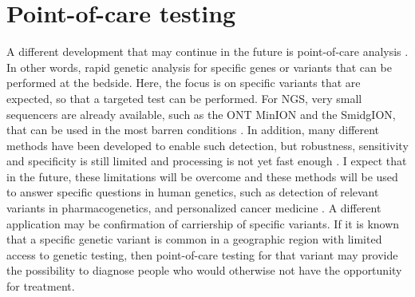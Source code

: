 \section{Point-of-care testing}
A different development that may continue in the future is point-of-care analysis \cite{Roberts_2012}. 
In other words, rapid genetic analysis for specific genes or variants that can be performed at the bedside. 
Here, the focus is on specific variants that are expected, so that a targeted test can be performed. 
For NGS, very small sequencers are already available, such as the ONT MinION and the SmidgION, that can be used in the most barren conditions \cite{Johnson_2017}. 
In addition, many different methods have been developed to enable such detection, but robustness, sensitivity and specificity is still limited and processing is not yet fast enough \cite{Zhang_2018}. 
I expect that in the future, these limitations will be overcome and these methods will be used to answer specific questions in human genetics, such as detection of relevant variants in pharmacogenetics, and personalized cancer medicine \cite{Dancey_2012}. 
A different application may be confirmation of carriership of specific variants. 
If it is known that a specific genetic variant is common in a geographic region with limited access to genetic testing, then point-of-care testing for that variant may provide the possibility to diagnose people who would otherwise not have the opportunity for treatment. 

